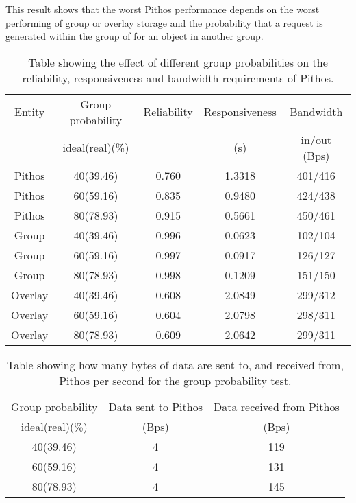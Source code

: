 This result shows that the worst Pithos performance depends on the worst performing of group or overlay storage and the probability that a request is generated within the group of for an object in another group.


\begin{table}[htbp]
\centering
\begin{tabular}{|c|c|c|c|c|}
\hline
Entity&Group probability&Reliability&Responsiveness&Bandwidth   \\
      & ideal(real)(\%) &           &     (s)      &in/out (Bps)\\
\hline
Pithos & 40(39.46)      &  0.760    & 1.3318       &   401/416  \\
Pithos & 60(59.16)      &  0.835    & 0.9480       &   424/438  \\
Pithos & 80(78.93)      &  0.915    & 0.5661       &   450/461  \\
\hline
Group & 40(39.46)       &  0.996    &   0.0623     &   102/104  \\
Group & 60(59.16)       &  0.997    &   0.0917     &   126/127  \\
Group & 80(78.93)       &  0.998    &   0.1209     &   151/150  \\
\hline
Overlay & 40(39.46)     &  0.608     &   2.0849     &   299/312  \\
Overlay & 60(59.16)     &  0.604     &   2.0798     &   298/311  \\
Overlay & 80(78.93)     &  0.609     &   2.0642     &   299/311  \\
\hline
\end{tabular}
\caption{Table showing the effect of different group probabilities on the reliability, responsiveness and bandwidth requirements of Pithos.}
\label{tab_group_prob_results}
\end{table}

\begin{table}[htbp]
\centering
\begin{tabular}{|c|c|c|}
\hline
Group probability& Data sent to Pithos   & Data received from Pithos\\
 ideal(real)(\%) &  (Bps)                &          (Bps)           \\
\hline
   40(39.46)     &       4               &          119             \\
   60(59.16)     &       4               &          131             \\
   80(78.93)     &       4               &          145              \\
\hline
\end{tabular}
\caption{Table showing how many bytes of data are sent to, and received from, Pithos per second for the group probability test.}
\label{tab_higher_data_results}
\end{table}

